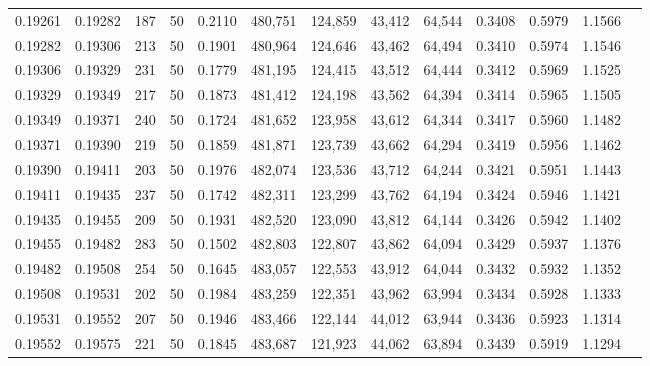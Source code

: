 \begin{tabular}{rrrrrrrrrrrrr}
0.19261 & 0.19282 &   187 &  50 &                                     0.2110 & 480,751 & 124,859 &  43,412 &  64,544 & 0.3408 & 0.5979 & 1.1566 \\
0.19282 & 0.19306 &   213 &  50 &                                     0.1901 & 480,964 & 124,646 &  43,462 &  64,494 & 0.3410 & 0.5974 & 1.1546 \\
0.19306 & 0.19329 &   231 &  50 &                                     0.1779 & 481,195 & 124,415 &  43,512 &  64,444 & 0.3412 & 0.5969 & 1.1525 \\
0.19329 & 0.19349 &   217 &  50 &                                     0.1873 & 481,412 & 124,198 &  43,562 &  64,394 & 0.3414 & 0.5965 & 1.1505 \\
0.19349 & 0.19371 &   240 &  50 &                                     0.1724 & 481,652 & 123,958 &  43,612 &  64,344 & 0.3417 & 0.5960 & 1.1482 \\
0.19371 & 0.19390 &   219 &  50 &                                     0.1859 & 481,871 & 123,739 &  43,662 &  64,294 & 0.3419 & 0.5956 & 1.1462 \\
0.19390 & 0.19411 &   203 &  50 &                                     0.1976 & 482,074 & 123,536 &  43,712 &  64,244 & 0.3421 & 0.5951 & 1.1443 \\
0.19411 & 0.19435 &   237 &  50 &                                     0.1742 & 482,311 & 123,299 &  43,762 &  64,194 & 0.3424 & 0.5946 & 1.1421 \\
0.19435 & 0.19455 &   209 &  50 &                                     0.1931 & 482,520 & 123,090 &  43,812 &  64,144 & 0.3426 & 0.5942 & 1.1402 \\
0.19455 & 0.19482 &   283 &  50 &                                     0.1502 & 482,803 & 122,807 &  43,862 &  64,094 & 0.3429 & 0.5937 & 1.1376 \\
0.19482 & 0.19508 &   254 &  50 &                                     0.1645 & 483,057 & 122,553 &  43,912 &  64,044 & 0.3432 & 0.5932 & 1.1352 \\
0.19508 & 0.19531 &   202 &  50 &                                     0.1984 & 483,259 & 122,351 &  43,962 &  63,994 & 0.3434 & 0.5928 & 1.1333 \\
0.19531 & 0.19552 &   207 &  50 &                                     0.1946 & 483,466 & 122,144 &  44,012 &  63,944 & 0.3436 & 0.5923 & 1.1314 \\
0.19552 & 0.19575 &   221 &  50 &                                     0.1845 & 483,687 & 121,923 &  44,062 &  63,894 & 0.3439 & 0.5919 & 1.1294 \\

\end{tabular}
